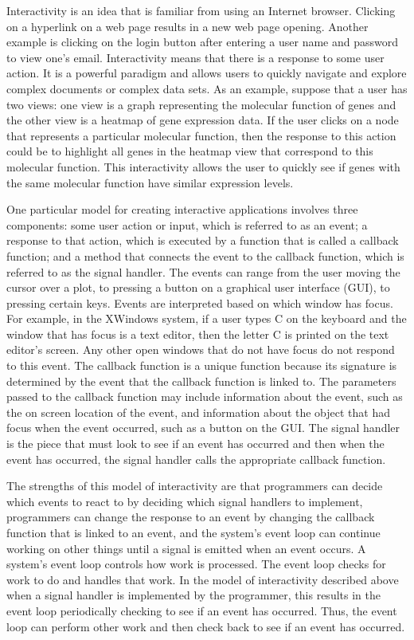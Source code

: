 \documentclass{article}[11pt]
\begin{document}
Interactivity is an idea that is familiar from using an Internet browser.
Clicking on a hyperlink on a web page results in a new web page
opening.  Another example is clicking on the login button after entering a
user name and password to view one's email.  Interactivity means that there is
a response to some user action.  It is a powerful paradigm and allows users to
quickly navigate and explore complex documents or complex data sets.  As an
example, suppose that a user has two views: one view is a graph representing
the molecular function of genes and the other view is a heatmap of gene
expression data.  If the user clicks on a node that represents a particular
molecular function, then the response to this action could be to highlight all
genes in the heatmap view that correspond to this molecular function.  This
interactivity allows the user to quickly see if genes with the same molecular
function have similar expression levels. 

One particular model for creating interactive applications involves three
components: some user action or input, which is referred to as an event;
a response to that action, which is executed by a function that is called
a callback function; and a method that connects the event to the callback
function, which is referred to as the signal handler.  The events can
range from the user moving the cursor over a plot, to pressing a button on a
graphical user interface (GUI), to pressing certain keys.  Events are
interpreted based on which window has focus.  For example, in the XWindows
system, if a user types C on the keyboard and the window that has focus is a
text editor, then the letter C is printed on the text editor's screen.
Any other open windows that do not have focus do not respond to this event.
The callback function is a unique function because its signature is determined
by the event that the callback function is linked to.  The parameters passed
to the callback function may include information about the event, such as the
on screen location of the event, and information about the object that had
focus when the event occurred, such as a button on the GUI.  The signal
handler is the piece that must look to see if an event has occurred and then
when the event has occurred, the signal handler calls the appropriate callback
function. 

The strengths of this model of interactivity are that programmers can decide
which events to react to by deciding which signal handlers to implement,
programmers can change the response to an event by changing the callback
function that is linked to an event, and the system's event loop can continue
working on other things until a signal is emitted when an event occurs.  A
system's event loop controls how work is processed.  The event loop checks for
work to do and handles that work.  In the model of interactivity described
above when a signal handler is implemented by the programmer, this results in
the event loop periodically checking to see if an event has occurred.  Thus,
the event loop can perform other work and then check back to see if an event
has occurred.
\end{document}
